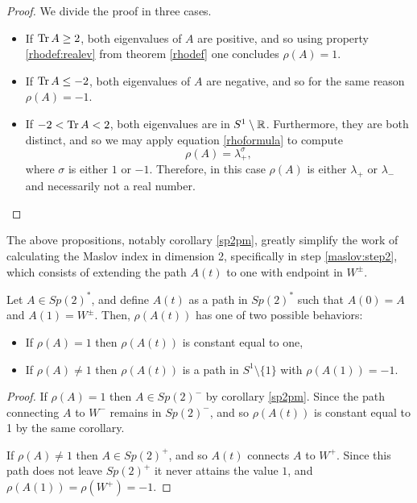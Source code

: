 \begin{proof}
We divide the proof in three cases.
\begin{itemize}
\item If $\operatorname{Tr} A \geq 2$, both eigenvalues of $A$ are positive, and so using property \ref{rhodef:realev} from theorem \ref{rhodef} one concludes $\rho(A) = 1$.
\item If $\operatorname{Tr} A \leq -2$, both eigenvalues of $A$ are negative, and so for the same reason $\rho(A) = -1$.
\item If $-2 < \operatorname{Tr} A < 2$, both eigenvalues are in $S^1 \setminus \mathbb{R}$. Furthermore, they are both distinct, and so we may apply equation \eqref{rhoformula} to compute
\begin{equation}\label{sp2pm:3}
\rho(A) = \lambda_+^\sigma,
\end{equation}
where $\sigma$ is either $1$ or $-1$. Therefore, in this case $\rho(A)$ is either $\lambda_+$ or $\lambda_-$ and necessarily not a real number.
\end{itemize}
\end{proof}

The above propositions, notably corollary \ref{sp2pm}, greatly simplify the work of calculating the Maslov index in dimension 2, specifically in step \ref{maslov:step2}, which consists of extending the path $A(t)$ to one with endpoint in $W^\pm$.

\begin{corollary}\label{sp2rhoextension}
Let $A \in Sp(2)^*$, and define $A(t)$ as a path in $Sp(2)^*$ such that $A(0) = A$ and $A(1) = W^\pm$. Then, $\rho(A(t))$ has one of two possible behaviors:
\begin{itemize}
\item If $\rho(A) = 1$ then $\rho(A(t))$ is constant equal to one,
\item If $\rho(A) \neq 1$ then $\rho(A(t))$ is a path in $S^1 \setminus \{1\}$ with $\rho(A(1)) = -1$.
\end{itemize}
\end{corollary}

\begin{proof}
If $\rho(A) = 1$ then $A \in Sp(2)^-$ by corollary \ref{sp2pm}. Since the path connecting $A$ to $W^-$ remains in $Sp(2)^-$, and so $\rho(A(t))$ is constant equal to 1 by the same corollary.

If $\rho(A) \neq 1$ then $A \in Sp(2)^+$, and so $A(t)$ connects $A$ to $W^+$. Since this path does not leave $Sp(2)^+$ it never attains the value $1$, and $\rho(A(1)) = \rho(W^+) = -1$.
\end{proof}

